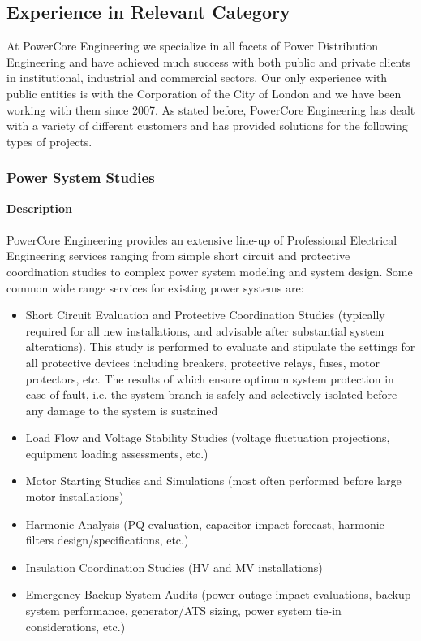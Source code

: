 \pagebreak

\subsection{Experience in Relevant Category}
\label{Sub:Exp}

\noindent At PowerCore Engineering we specialize in all facets of Power Distribution Engineering and have achieved much success with both public and private clients in institutional, industrial and commercial sectors.  Our only experience with public entities is with the Corporation of the City of London and we have been working with them since 2007.  As stated before, PowerCore Engineering has dealt with a variety of different customers and has provided solutions for the following types of projects.

\subsubsection{Power System Studies}
\label{Sub:Exp:PSS}

\textbf{Description}\\
\\
PowerCore Engineering provides an extensive line-up of Professional Electrical Engineering services ranging from simple short circuit and protective coordination studies to complex power system modeling and system design. Some common wide range services for existing power systems are:
\begin{itemize}
	\item Short Circuit Evaluation and Protective Coordination Studies (typically required for all new installations, and advisable after substantial system alterations). This study is performed to evaluate and stipulate the settings for all protective devices including breakers, protective relays, fuses, motor protectors, etc. The results of which ensure optimum system protection in case of fault, i.e. the system branch is safely and selectively isolated before any damage to the system is sustained
	\item Load Flow and Voltage Stability Studies (voltage fluctuation projections, equipment loading assessments, etc.)
	\item Motor Starting Studies and Simulations (most often performed before large motor installations)
	\item Harmonic Analysis (PQ evaluation, capacitor impact forecast, harmonic filters design/specifications, etc.)
	\item Insulation Coordination Studies (HV and MV installations)
	\item Emergency Backup System Audits (power outage impact evaluations, backup system performance, generator/ATS sizing, power system tie-in considerations, etc.)
\end{itemize}


